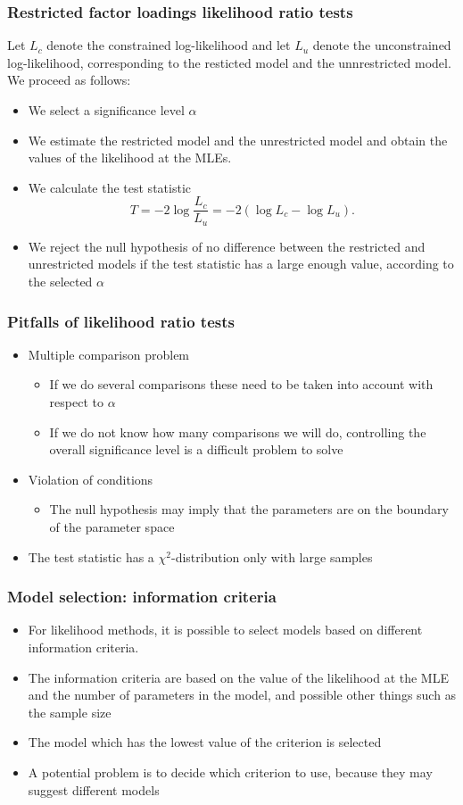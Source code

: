 \documentclass[compress]{beamer}
\begin{document}
\begin{frame}[fragile]
\frametitle{Restricted factor loadings likelihood ratio tests}
Let $L_c$ denote the constrained log-likelihood and let $L_u$ denote the unconstrained log-likelihood, corresponding to the resticted model and the unnrestricted model. We proceed as follows:
\begin{itemize}
\item We select a significance level $\alpha$
\item We estimate the restricted model and the unrestricted model and obtain the values of the likelihood at the MLEs.
\item We calculate the test statistic
\[
T = -2\log \frac{L_c}{L_u} = -2(\log L_c - \log L_u).
\]
\item We reject the null hypothesis of no difference between the restricted and unrestricted models if the test statistic has a large enough value, according to the selected $\alpha$
\end{itemize}
\end{frame}

\begin{frame}[fragile]
\frametitle{Pitfalls of likelihood ratio tests}
\begin{itemize}
\item Multiple comparison problem
\begin{itemize}
\item If we do several comparisons these need to be taken into account with respect to $\alpha$
\item If we do not know how many comparisons we will do, controlling the overall significance level is a difficult problem to solve
\end{itemize}
\item Violation of conditions
\begin{itemize}
\item The null hypothesis may imply that the parameters are on the boundary of the parameter space
\end{itemize}
\item The test statistic has a $\chi^2$-distribution only with large samples
\end{itemize}
\end{frame}

\begin{frame}[fragile]
\frametitle{Model selection: information criteria}
\begin{itemize}
\item For likelihood methods, it is possible to select models based on different information criteria. 
\item The information criteria are based on the value of the likelihood at the MLE and the number of parameters in the model, and possible other things such as the sample size
\item The model which has the lowest value of the criterion is selected
\item A potential problem is to decide which criterion to use, because they may suggest different models
\end{itemize}
\end{frame}
\end{document}

